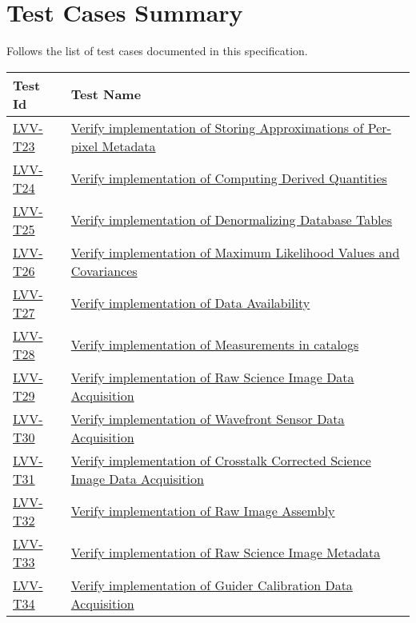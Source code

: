 \section{Test Cases Summary}\label{test-cases-summary}

Follows the list of test cases documented in this specification.

\begin{longtable}[]{p{3cm}p{13cm}}
\toprule
Test Id & Test Name\tabularnewline
\midrule
\endhead
    \hyperref[lvv-t23]{LVV-T23} &
    \href{https://jira.lsstcorp.org/secure/Tests.jspa\#/testCase/LVV-T23}{Verify implementation of Storing Approximations of Per-pixel Metadata} \tabularnewline
    \hyperref[lvv-t24]{LVV-T24} &
    \href{https://jira.lsstcorp.org/secure/Tests.jspa\#/testCase/LVV-T24}{Verify implementation of Computing Derived Quantities} \tabularnewline
    \hyperref[lvv-t25]{LVV-T25} &
    \href{https://jira.lsstcorp.org/secure/Tests.jspa\#/testCase/LVV-T25}{Verify implementation of Denormalizing Database Tables} \tabularnewline
    \hyperref[lvv-t26]{LVV-T26} &
    \href{https://jira.lsstcorp.org/secure/Tests.jspa\#/testCase/LVV-T26}{Verify implementation of Maximum Likelihood Values and Covariances} \tabularnewline
    \hyperref[lvv-t27]{LVV-T27} &
    \href{https://jira.lsstcorp.org/secure/Tests.jspa\#/testCase/LVV-T27}{Verify implementation of Data Availability} \tabularnewline
    \hyperref[lvv-t28]{LVV-T28} &
    \href{https://jira.lsstcorp.org/secure/Tests.jspa\#/testCase/LVV-T28}{Verify implementation of Measurements in catalogs} \tabularnewline
    \hyperref[lvv-t29]{LVV-T29} &
    \href{https://jira.lsstcorp.org/secure/Tests.jspa\#/testCase/LVV-T29}{Verify implementation of Raw Science Image Data Acquisition} \tabularnewline
    \hyperref[lvv-t30]{LVV-T30} &
    \href{https://jira.lsstcorp.org/secure/Tests.jspa\#/testCase/LVV-T30}{Verify implementation of Wavefront Sensor Data Acquisition} \tabularnewline
    \hyperref[lvv-t31]{LVV-T31} &
    \href{https://jira.lsstcorp.org/secure/Tests.jspa\#/testCase/LVV-T31}{Verify implementation of Crosstalk Corrected Science Image Data Acquisition} \tabularnewline
    \hyperref[lvv-t32]{LVV-T32} &
    \href{https://jira.lsstcorp.org/secure/Tests.jspa\#/testCase/LVV-T32}{Verify implementation of Raw Image Assembly} \tabularnewline
    \hyperref[lvv-t33]{LVV-T33} &
    \href{https://jira.lsstcorp.org/secure/Tests.jspa\#/testCase/LVV-T33}{Verify implementation of Raw Science Image Metadata} \tabularnewline
    \hyperref[lvv-t34]{LVV-T34} &
    \href{https://jira.lsstcorp.org/secure/Tests.jspa\#/testCase/LVV-T34}{Verify implementation of Guider Calibration Data Acquisition} \tabularnewline

\end{longtable}
